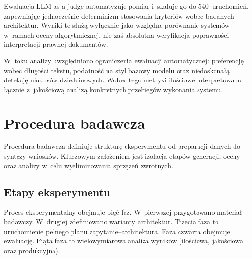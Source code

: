 Ewaluacja LLM-as-a-judge automatyzuje pomiar i~skaluje go do 540~uruchomień,
zapewniając jednocześnie determinizm stosowania kryteriów wobec badanych
architektur. Wyniki te służą wyłącznie jako względne porównanie systemów
w~ramach oceny algorytmicznej, nie zaś absolutna weryfikacja poprawności
interpretacji prawnej dokumentów.

W~toku analizy uwzględniono ograniczenia ewaluacji automatycznej: preferencję
wobec długości tekstu, podatność na styl bazowy modelu oraz niedoskonałą
detekcję niuansów dziedzinowych. Wobec tego metryki ilościowe interpretowano
łącznie z~jakościową analizą konkretnych przebiegów wykonania systemu.

\section{Procedura badawcza}\label{sec:procedura-badawcza}

Procedura badawcza definiuje strukturę eksperymentu od preparacji danych do
syntezy wniosków. Kluczowym założeniem jest izolacja etapów generacji, oceny
oraz analizy w~celu wyeliminowania sprzężeń zwrotnych.

\subsection{Etapy eksperymentu}\label{subsec:etapy-eksperymentu}

Proces eksperymentalny obejmuje pięć faz. W~pierwszej przygotowano materiał
badawczy. W~drugiej zdefiniowano warianty architektur. Trzecia faza to
uruchomienie pełnego planu zapytanie--architektura. Faza czwarta obejmuje
ewaluację. Piąta faza to wielowymiarowa analiza wyników (ilościowa, jakościowa
oraz produkcyjna).

